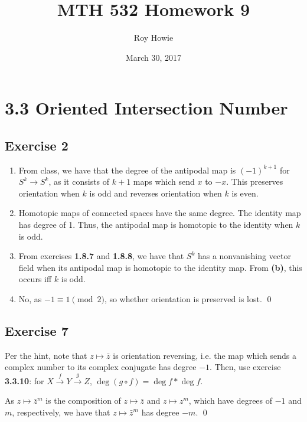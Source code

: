 \documentclass{article}
\begin{document}
\title{\vspace{-2cm}MTH 532 Homework 9}
\author{Roy Howie}
\date{March 30, 2017}
\maketitle

\section*{3.3 Oriented Intersection Number}
  \subsection*{Exercise 2}
    \begin{enumerate}[label=\textbf{(\alph*)}]
      \item{
        From class, we have that the degree of the antipodal map is $(-1)^{k+1}$
        for $S^k\to S^k$, as it consists of $k+1$ maps which send $x$ to $-x$.
        This preserves orientation when $k$ is odd and reverses orientation when
        $k$ is even.
      }
      \item{
        Homotopic maps of connected spaces have the same degree. The identity
        map has degree of 1. Thus, the antipodal map is homotopic to the
        identity when $k$ is odd.
      }
      \item{
        From exercises \textbf{1.8.7} and \textbf{1.8.8}, we have that $S^k$ has
        a nonvanishing vector field when its antipodal map is homotopic to the
        identity map. From \textbf{(b)}, this occurs iff $k$ is odd.
      }
      \item{
        No, as $-1\equiv1\pmod{2}$, so whether orientation is preserved is lost.
      }
      \qed
    \end{enumerate}

  \subsection*{Exercise 7}
    Per the hint, note that $z\mapsto\bar{z}$ is orientation reversing, i.e. the
    map which sends a complex number to its complex conjugate has degree $-1$.
    Then, use exercise \textbf{3.3.10}: for $X\xrightarrow{f}Y\xrightarrow{g}Z$,
    $\deg(g\circ f)=\deg{f}*\deg{f}$.

    As $z\mapsto\bar{z}^m$ is the composition
    of $z\mapsto\bar{z}$ and $z\mapsto z^m$, which have degrees of $-1$ and $m$,
    respectively, we have that $z\mapsto\bar{z}^m$ has degree $-m$.
    \qed
\end{document}
